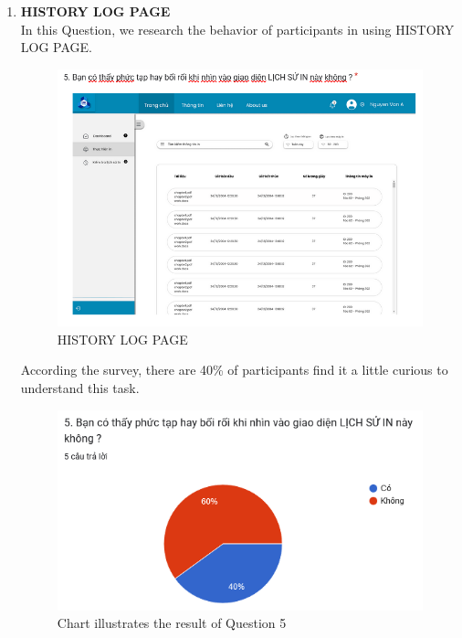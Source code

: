 \documentclass[a4paper]{report}
\begin{document}
\begin{enumerate}
    \item \textbf{HISTORY LOG PAGE} \\
    In this Question, we research the behavior of participants in using HISTORY LOG PAGE.
\begin{figure}[!h]
    \centering
    \includegraphics[width=0.8\linewidth]{images/image_uasbility/Q5_Stu.png}
    \caption{HISTORY LOG PAGE}
    \label{fig:HISTORY LOG PAGE}
\end{figure}
\newpage
According the survey, there are 40\% of participants find it a little curious to understand this task.
\begin{figure}[!h]
    \centering
    \includegraphics[width=0.8\linewidth]{images/image_uasbility/A5_Stu.png}
    \caption{Chart illustrates the result of Question 5}
    \label{fig:Chart illustrates the result of Question 5}
\end{figure}
\end{enumerate}
\end{document}
